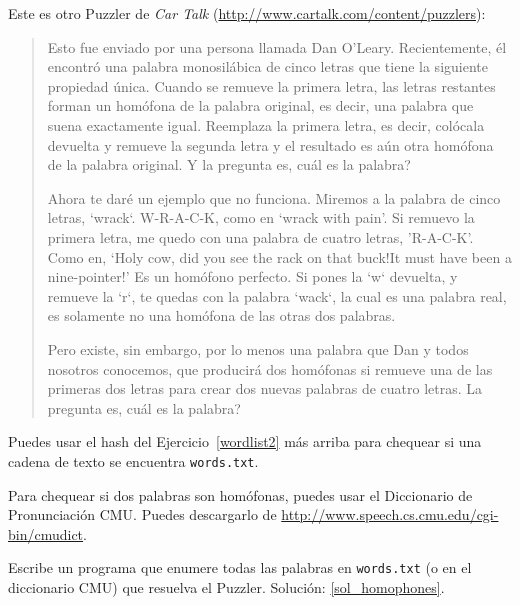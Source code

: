 \begin{exercise}
\label{homophones}

Este es otro Puzzler de {\em Car Talk} 
(\url{http://www.cartalk.com/content/puzzlers}):

\begin{quote}

Esto fue enviado por una persona llamada Dan O'Leary. Recientemente,
él encontró una palabra monosilábica de cinco letras que tiene la 
siguiente propiedad única. Cuando se remueve la primera letra, las 
letras restantes forman un homófona de la palabra original, es decir,
una palabra que suena exactamente igual. Reemplaza la primera letra,
es decir, colócala devuelta y remueve la segunda letra y el resultado
es aún otra homófona de la palabra original. Y la pregunta es, cuál es
la palabra?

Ahora te daré un ejemplo que no funciona. Miremos a la palabra de cinco
letras, `wrack`. W-R-A-C-K, como en `wrack with pain'. Si remuevo la primera
letra, me quedo con una palabra de cuatro letras, 'R-A-C-K'. Como en, 
`Holy cow, did you see the rack on that buck!It must have been a nine-pointer!' 
Es un homófono perfecto. Si pones la `w` devuelta, y remueve la `r`, te quedas
con la palabra `wack`, la cual es una palabra real, es solamente no una homófona de
las otras dos palabras.

Pero existe, sin embargo, por lo menos una palabra que Dan y todos
nosotros conocemos, que producirá dos homófonas si remueve una de las primeras
dos letras para crear dos nuevas palabras de cuatro letras. La pregunta es,
cuál es la palabra?
\end{quote}

Puedes usar el hash del Ejercicio~\ref{wordlist2} más arriba para
chequear si una cadena de texto se encuentra {\tt words.txt}.

Para chequear si dos palabras son homófonas, puedes usar el 
Diccionario de Pronunciación CMU. Puedes descargarlo de 
\url{http://www.speech.cs.cmu.edu/cgi-bin/cmudict}.

Escribe un programa que enumere todas las palabras en {\tt words.txt}
(o en el diccionario CMU) que resuelva el Puzzler.
Solución: \ref{sol_homophones}.

\end{exercise}


